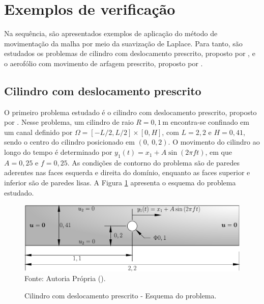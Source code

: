 \section{Exemplos de verificação}

Na sequência, são apresentados exemplos de aplicação do método de movimentação da malha por meio da suavização de Laplace. Para tanto, são estudados os problemas de cilindro com deslocamento prescrito, proposto por , e o aerofólio com movimento de arfagem prescrito, proposto por .

\subsection{Cilindro com deslocamento prescrito}

O primeiro problema estudado é o cilindro com deslocamento prescrito, proposto por . Nesse problema, um cilindro de raio $R=0,1\,\mathrm{m}$ encontra-se confinado em um canal definido por $\Omega=[-L/2, L/2]\times[0,H]$, com $L=2,2$ e $H=0,41$, sendo o centro do cilindro posicionado em $(0,\ 0,2)$. O movimento do cilindro ao longo do tempo é determinado por $y_1(t)=x_1+A\sin{(2\pi f t)}$, em que $A=0,25$ e $f=0,25$. As condições de contorno do problema são de paredes aderentes nas faces esquerda e direita do domínio, enquanto as faces superior e inferior são de paredes lisas. A Figura \ref{fig:moving-cylinder} apresenta o esquema do problema estudado.

\begin{figure}[h!]
    \centering
    \caption{Cilindro com deslocamento prescrito - Esquema do problema.}
    \includegraphics[width=.7\linewidth]{Figuras/moving-cylinder/moving-cilinder.pdf}
    \\Fonte: Autoria Própria (\the\year).
    \label{fig:moving-cylinder}
\end{figure}

